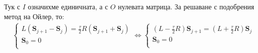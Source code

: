 \documentclass[bulgarian, 12pt]{article}
\begin{document}
\begin{large}
\begin{equation*}
\end{equation*} 
Тук с $I$ означихме единичната, а с $O$ нулевата матрица. За решаване с подобрения метод на Ойлер, то:
\begin{align*}
	&\begin{cases}
		L \left(\mathbf{S}_{j+1} - \mathbf{S}_{j}\right) = 
		\frac{\tau}{2} R \left(\mathbf{S}_{j+1} + \mathbf{S}_{j}\right)  \\
		\mathbf{S}_{0} = 0 \\
	\end{cases} \iff
	\begin{cases}
		(L - \frac{\tau}{2} R)\mathbf{S}_{j+1} = (L + \frac{\tau}{2} R) \mathbf{S}_{j} \\
		\mathbf{S}_{0} = 0 \\
	\end{cases}
\end{align*}


\end{large}
\end{document}
